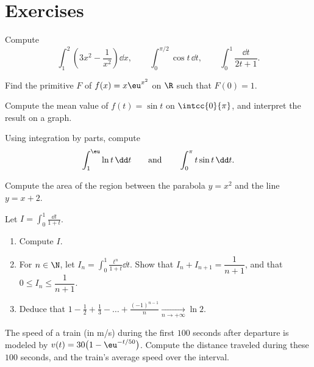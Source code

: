\section{Exercises}

\begin{exercise}[$\star$]\label{exo:tle:integ:1}
Compute
\[
\int_1^2 \left(3x^2 - \frac{1}{x^2}\right)\dd x, \qquad
\int_0^{\pi/2} \cos t \,\dd t, \qquad
\int_0^{1} \frac{\dd t}{2t+1} .
\]
\end{exercise}

\begin{exercise}[$\star$]\label{exo:tle:integ:2}
Find the primitive $F$ of $f(x) = x\eu^{x^2}$ on $\R$ such that $F(0) = 1$.
\end{exercise}

\begin{exercise}[$\star$]\label{exo:tle:integ:3}
Compute the mean value of $f(t) = \sin t$ on $\intcc{0}{\pi}$, and interpret
the result on a graph.
\end{exercise}

\begin{exercise}[$\star\star$]\label{exo:tle:integ:4}
Using integration by parts, compute
\[
\int_1^{\eu} \ln t\,\dd t
\qquad\text{and}\qquad
\int_0^{\pi} t \sin t\,\dd t .
\]
\end{exercise}

\begin{exercise}[$\star\star$]\label{exo:tle:integ:5}
Compute the area of the region between the parabola $y = x^2$ and the line
$y = x + 2$.
\end{exercise}

\begin{exercise}[$\star\star$]\label{exo:tle:integ:6}
Let $I = \displaystyle\int_0^1 \frac{\dd t}{1 + t}$.
\begin{enumerate}
  \item Compute $I$.
  \item For $n \in \N$, let $I_n = \displaystyle\int_0^1 \frac{t^n}{1+t}\dd t$.
        Show that $I_n + I_{n+1} = \dfrac{1}{n+1}$, and that
        $0 \leq I_n \leq \dfrac{1}{n+1}$.
  \item Deduce that
        $1 - \frac12 + \frac13 - \dots + \frac{(-1)^{n-1}}{n}
        \xrightarrow[n \to +\infty]{} \ln 2$.
\end{enumerate}
\end{exercise}

\begin{exercise}[$\star\star$]\label{exo:tle:integ:7}
The speed of a train (in m/s) during the first $100$ seconds after departure
is modeled by $v(t) = 30\bigl(1 - \eu^{-t/50}\bigr)$. Compute the distance
traveled during these $100$ seconds, and the train's average speed over the
interval.
\end{exercise}

